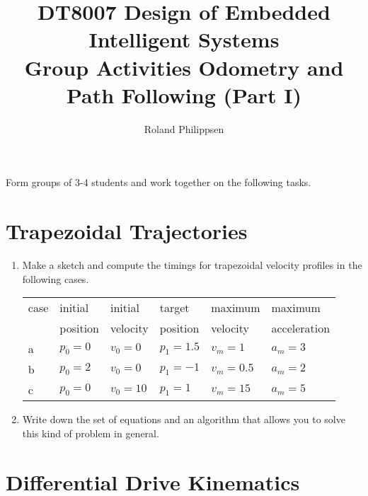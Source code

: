 \documentclass[a4paper]{article}
\begin{document}
\title{
  \large
  DT8007 Design of Embedded Intelligent Systems\\
  \Large
  Group Activities Odometry and Path Following (Part I)}
\author{Roland Philippsen}
\maketitle

\noindent
Form groups of 3-4 students and work together on the following tasks.

\section*{Trapezoidal Trajectories}

\begin{enumerate}

\item
  Make a sketch and compute the timings for trapezoidal velocity profiles in the following cases.
  
  \begin{center}
    \begin{tabular}{llllll}
      \toprule
      case & initial & initial & target & maximum & maximum \\
      & position & velocity & position & velocity & acceleration \\
      \midrule
      a & $p_0=0$ & $v_0=0$  & $p_1=1.5$ & $v_m=1$   & $a_m=3$ \\
      b & $p_0=2$ & $v_0=0$  & $p_1=-1$  & $v_m=0.5$ & $a_m=2$ \\
      c & $p_0=0$ & $v_0=10$ & $p_1=1$   & $v_m=15$  & $a_m=5$ \\
      \bottomrule
    \end{tabular}
  \end{center}
  
\item
  Write down the set of equations and an algorithm that allows you to solve this kind of problem in general.

\end{enumerate}

\section*{Differential Drive Kinematics}
\end{document}
